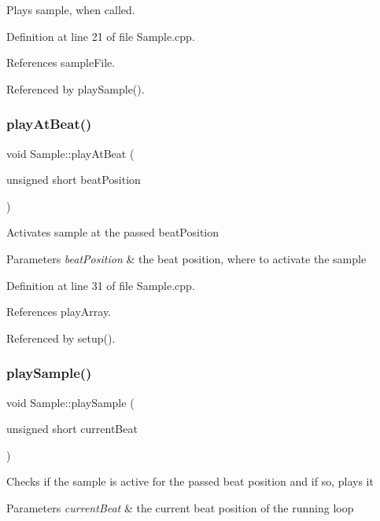 Plays sample, when called. 



Definition at line 21 of file Sample.\+cpp.



References sample\+File.



Referenced by play\+Sample().

\mbox{\label{class_sample_a26322924f7a05091e13380c6494896da}} 
\subsubsection{\texorpdfstring{play\+At\+Beat()}{playAtBeat()}}
{\footnotesize\ttfamily void Sample\+::play\+At\+Beat (\begin{DoxyParamCaption}\item[{unsigned short}]{beat\+Position }\end{DoxyParamCaption})}

Activates sample at the passed beat\+Position 
\begin{DoxyParams}{Parameters}
{\em beat\+Position} & the beat position, where to activate the sample \\
\hline
\end{DoxyParams}


Definition at line 31 of file Sample.\+cpp.



References play\+Array.



Referenced by setup().

\mbox{\label{class_sample_a720e0e4edc0eacfb6170951177eabc31}} 
\subsubsection{\texorpdfstring{play\+Sample()}{playSample()}}
{\footnotesize\ttfamily void Sample\+::play\+Sample (\begin{DoxyParamCaption}\item[{unsigned short}]{current\+Beat }\end{DoxyParamCaption})}

Checks if the sample is active for the passed beat position and if so, plays it 
\begin{DoxyParams}{Parameters}
{\em current\+Beat} & the current beat position of the running loop \\
\hline
\end{DoxyParams}


